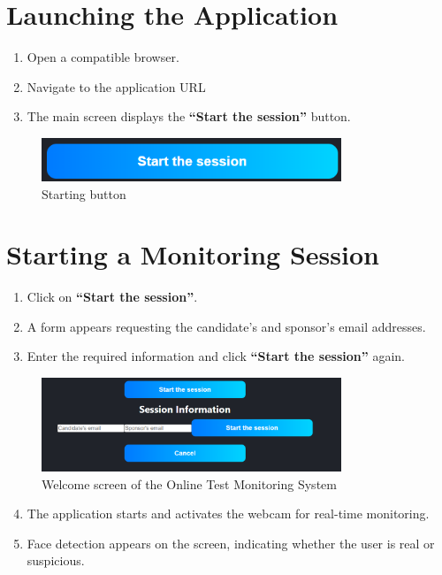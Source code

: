 \documentclass[a4paper,12pt]{article}
\begin{document}
\section{Launching the Application}
\begin{enumerate}
    \item Open a compatible browser.
    \item Navigate to the application URL
    \item The main screen displays the \textbf{``Start the session''} button. 
\end{enumerate}

\begin{figure}[h!]
    \centering
    \includegraphics[width=0.8\textwidth]{IMG/start_session_btn.png}
    \caption{Starting button}
    \label{fig:welcome_screen}
\end{figure}


\section{Starting a Monitoring Session}
\begin{enumerate}
    \item Click on \textbf{``Start the session''}.
    \item A form appears requesting the candidate's and sponsor's email addresses.
    \item Enter the required information and click \textbf{``Start the session''} again.
\end{enumerate}

\begin{figure}[h!]
    \centering
    \includegraphics[width=0.8\textwidth]{IMG/email_registration.png}
    \caption{Welcome screen of the Online Test Monitoring System}
    \label{fig:welcome_screen}
\end{figure}

\begin{enumerate}
    \setcounter{enumi}{3}
    \item The application starts and activates the webcam for real-time monitoring.
    \item Face detection appears on the screen, indicating whether the user is real or suspicious.
\end{enumerate}
\end{document}
